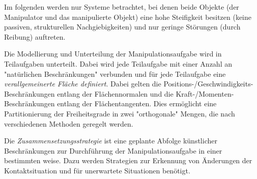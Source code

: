 		Im folgenden werden nur Systeme betrachtet, bei denen beide Objekte (\dh der Manipulator und das manipulierte Objekt) eine hohe Steifigkeit besitzen (\dh keine passiven, strukturellen Nachgiebigkeiten) und nur geringe Störungen (\zB durch Reibung) auftreten.
		
		Die Modellierung und Unterteilung der Manipulationsaufgabe wird in Teilaufgaben unterteilt. Dabei wird jede Teilaufgabe mit einer Anzahl an "natürlichen Beschränkungen" verbunden und für jede Teilaufgabe eine \emph{verallgemeinerte Fläche definiert}. Dabei gelten die Positions-/Geschwindigkeits-Beschränkungen entlang der Flächennormalen und die Kraft-/Momenten-Beschränkungen entlang der Flächentangenten. Dies ermöglicht eine Partitionierung der Freiheitsgrade in zwei "orthogonale" Mengen, die nach verschiedenen Methoden geregelt werden.
		
		Die \emph{Zusammensetzungsstrategie} ist eine geplante Abfolge künstlicher Beschränkungen zur Durchführung der Manipulationsaufgabe in einer bestimmten weise. Dazu werden Strategien zur Erkennung von Änderungen der Kontaktsituation und für unerwartete Situationen benötigt.
		
